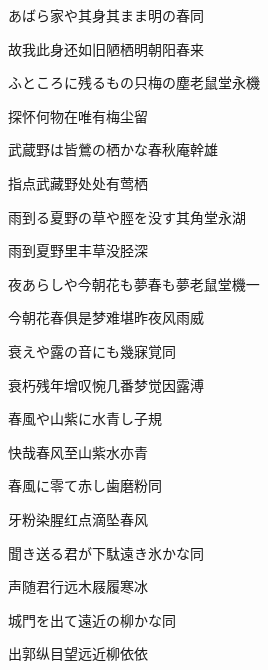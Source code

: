 \begin{haiku}
    {\FH あばら家や其身其まま明の春}\hfill{\FH 同}

    {\FK 故我此身还如旧陋栖明朝阳春来}
\end{haiku}

\begin{haiku}
    {\FH ふところに残るもの只梅の塵}\hfill{\FH 老鼠堂永機}

    {\FK 探怀何物在唯有梅尘留}
\end{haiku}

\begin{haiku}
    {\FH 武蔵野は皆鶯の栖かな}\hfill{\FH 春秋庵幹雄}

    {\FK 指点武藏野处处有莺栖}
\end{haiku}

\begin{haiku}
    {\FH 雨到る夏野の草や脛を没す}\hfill{\FH 其角堂永湖}

    {\FK 雨到夏野里丰草没胫深}
\end{haiku}

\begin{haiku}
    {\FH 夜あらしや今朝花も夢春も夢}\hfill{\FH 老鼠堂機一}

    {\FK 今朝花春俱是梦难堪昨夜风雨威}
\end{haiku}

\begin{haiku}
    {\FH 衰えや露の音にも幾寐覚}\hfill{\FH 同}

    {\FK 衰朽残年增叹惋几番梦觉因露溥}
\end{haiku}

\begin{haiku}
    {\FH 春風や山紫に水青し}\hfill{\FH 子規}

    {\FK 快哉春风至山紫水亦青}
\end{haiku}

\begin{haiku}
    {\FH 春風に零て赤し歯磨粉}\hfill{\FH 同}

    {\FK 牙粉染腥红点滴坠春风}
\end{haiku}

\begin{haiku}
    {\FH 聞き送る君が下駄遠き氷かな}\hfill{\FH 同}

    {\FK 声随君行远木屐履寒冰}
\end{haiku}

\begin{haiku}
    {\FH 城門を出て遠近の柳かな}\hfill{\FH 同}

    {\FK 出郭纵目望远近柳依依}
\end{haiku}

